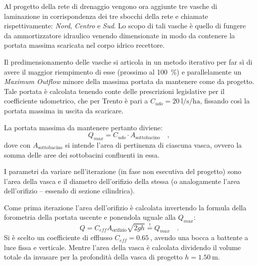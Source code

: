 Al progetto della rete di drenaggio vengono ora aggiunte tre vasche di laminazione in corrispondenza dei tre sbocchi della rete e chiamate rispettivamente: \emph{Nord}, \emph{Centro} e \emph{Sud}.
Lo scopo di tali vasche è quello di fungere da ammortizzatore idraulico venendo dimensionate in modo da contenere la portata massima scaricata nel corpo idrico recettore.

Il predimensionamento delle vasche si articola in un metodo iterativo per far sì di avere il maggior riempimento di esse (prossimo al \SI{100}{\percent}) e parallelamente un \emph{Maximum Outflow} minore della massima portata da mantenere come da progetto. 
Tale portata è calcolata tenendo conte delle prescrizioni legislative per il coefficiente udometrico, che per Trento è pari a $C_{udo} = \SI{20}{\litre\per\second\per\hectare}$, fissando così la portata massima in uscita da scaricare. 

La portata massima da mantenere pertanto diviene:
\begin{equation}
    Q_{max} = C_{udo} \cdot A_{\text{sottobacino}}
    \label{eq:qmax} \quad ,
\end{equation}
dove con $A_{\text{sottobacino}}$ si intende l'area di pertinenza di ciascuna vasca, ovvero la somma delle aree dei sottobacini confluenti in essa.

I parametri da variare nell'iterazione (in fase non esecutiva del progetto) sono l'area della vasca e il diametro dell'orifizio della stessa (o analogamente l'area dell'orifizio -- essendo di sezione cilindrica). 


Come prima iterazione l'area dell'orifizio è calcolata invertendo la formula della forometria della portata uscente e ponendola uguale alla $Q_{max}$:
\begin{equation}
    Q  = C_{eff} A_{\text{orifizio}} \sqrt{2 g h} \overset{!}{=} Q_{max} \quad .
\end{equation}
Si è scelto un coefficiente di efflusso $C_{eff} = \SI{0.65}{}$, avendo una bocca a battente a luce fissa e verticale. 
Mentre l'area della vasca è calcolata dividendo il volume totale da invasare per la profondità della vasca di progetto $h = \SI{1.50}{\metre}$.

